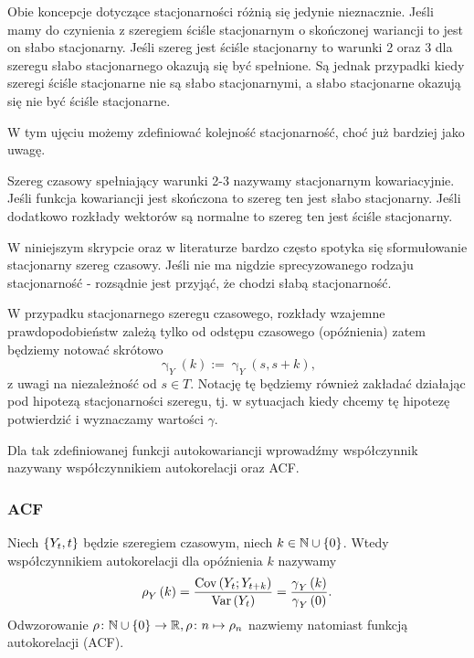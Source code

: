 \documentclass[10pt,a4paper]{book}
\newcommand{\tsAutoCovariance}[3][\gamma]{\operatorname{#1}_{#2} \left({#3}\right)}
\newcommand{\tsAutoCorellation}[3][\rho]{\operatorname{#1}_{#2} \left({#3}\right)}
\begin{document}
Obie koncepcje dotyczące stacjonarności różnią się jedynie nieznacznie. Jeśli mamy do czynienia z szeregiem ściśle stacjonarnym o skończonej wariancji to jest on słabo stacjonarny. Jeśli szereg jest ściśle stacjonarny to warunki 2 oraz 3 dla szeregu słabo stacjonarnego okazują się być spełnione. Są jednak przypadki kiedy szeregi ściśle stacjonarne nie są słabo stacjonarnymi, a słabo stacjonarne okazują się nie być ściśle stacjonarne.

W tym ujęciu możemy zdefiniować kolejność stacjonarność, choć już bardziej jako uwagę.

\begin{remark}
Szereg czasowy spełniający warunki 2-3 nazywamy stacjonarnym kowariacyjnie. Jeśli funkcja kowariancji jest skończona to szereg ten jest słabo stacjonarny. Jeśli dodatkowo rozkłady wektorów są normalne to szereg ten jest ściśle stacjonarny.
\end{remark}

\begin{remark}
W niniejszym skrypcie oraz w literaturze bardzo często spotyka się sformułowanie stacjonarny szereg czasowy. Jeśli nie ma nigdzie sprecyzowanego rodzaju stacjonarność - rozsądnie jest przyjąć, że chodzi słabą stacjonarność.
\end{remark}

\begin{remark}
W przypadku stacjonarnego szeregu czasowego, rozkłady wzajemne prawdopodobieństw zależą tylko od odstępu czasowego (opóźnienia) zatem będziemy notować skrótowo 
$$
\tsAutoCovariance{Y}{k} := \tsAutoCovariance{Y}{s,s+k},
$$
z uwagi na niezależność od $s \in T$. Notację tę będziemy również zakładać działając pod hipotezą stacjonarności szeregu, tj. w sytuacjach kiedy chcemy tę hipotezę potwierdzić i wyznaczamy wartości $\gamma$.
\end{remark}

Dla tak zdefiniowanej funkcji autokowariancji wprowadźmy współczynnik nazywany współczynnikiem autokorelacji oraz ACF.

\subsubsection{ACF}

\begin{definition}
Niech $\left\lbrace {{Y_t}, {t}} \right\rbrace$ będzie szeregiem czasowym, niech $k \in \mathbb{N} \cup \left\lbrace {0} \right\rbrace $. Wtedy współczynnikiem autokorelacji dla opóźnienia $k$ nazywamy
$$
\tsAutoCorellation{Y}{k}= \frac{\Covariance{Y_t}{Y_{t+k}}}{\Variance{Y_t}} = \frac{\tsAutoCovariance{Y}{k} }{\tsAutoCovariance{Y}{0}}.
$$
Odwzorowanie $\rho\colon \mathbb{N} \cup \left\lbrace {0} \right\rbrace \to \mathbb{R},  \rho \colon n \mapsto \rho_n$ nazwiemy natomiast funkcją autokorelacji (ACF).
\end{definition}
\end{document}
